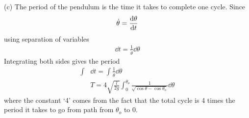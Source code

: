 \documentclass[../hw.tex]{subfiles}
\begin{document}
(c) The period of the pendulum is the time it takes to complete one cycle. Since
\begin{align*}
    \dot\theta = \dv{\theta}{t}
\end{align*}
using separation of variables
\begin{align*}
    \dd{t} = \frac{1}{\dot\theta} \dd{\theta}
\end{align*}
Integrating both sides gives the period
\begin{align*}
    \int &\dd{t} = \int \frac{1}{\dot\theta} \dd{\theta} \\
    &\boxed{T = 4\sqrt{\frac{l}{2g}}
    \int_0^{\theta_o} \frac{1}{\sqrt{\cos\theta - \cos\theta_o}} \dd{\theta}}
\end{align*}
where the constant `4' comes from the fact that the total cycle is 4 times the period it takes to go
from path from $\theta_o$
to $0$.
\end{document}
